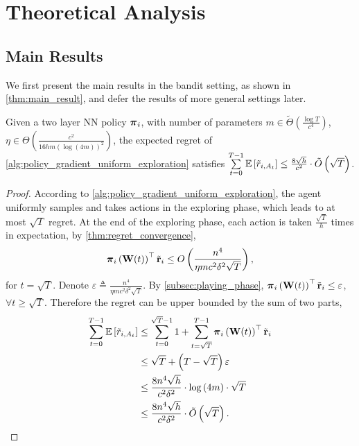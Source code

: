 \section{Theoretical Analysis}

\subsection{Main Results}
\label{subsec:main_results}

We first present the main results in the bandit setting, as shown in \cref{thm:main_result}, and defer the results of more general settings later.

\begin{thm}
\label{thm:main_result}
    Given a two layer NN policy ${\boldsymbol{\pi}}_i$, with number of parameters $m \in \tilde{\Theta}\left( \frac{\log{T}}{c^4} \right)$, $\eta \in \Theta\left( \frac{c^2}{16 h m \left( \log{\left(4m\right)} \right)^2} \right)$, the expected regret of \cref{alg:policy_gradient_uniform_exploration} satisfies $\sum\limits_{t=0}^{T-1}{ {\mathbb{E}} \left[ \tilde{r}_{i, A_t} \right] } \le  \frac{8\sqrt{h}}{c^2} \cdot \tilde{O}\left( \sqrt{T} \right)$.
\end{thm}
\begin{proof}
According to \cref{alg:policy_gradient_uniform_exploration}, the agent uniformly samples and takes actions in the exploring phase, which leads to at most $\sqrt{T}$ regret. At the end of the exploring phase, each action is taken $\frac{\sqrt{T}}{h}$ times in expectation, by \cref{thm:regret_convergence}, 
\begin{equation*}
\begin{split}
    {\boldsymbol{\pi}}_i\left( {\mathbf{W}}(t) \right)^\top {\tilde{\mathbf{r}}}_i \le O\left( \frac{n^4}{\eta m c^2 \delta^2 \sqrt{T}} \right),
\end{split}
\end{equation*}
for $t = \sqrt{T}$. Denote $\varepsilon \triangleq \frac{n^4}{\eta m c^2 \delta^2 \sqrt{T}}$. By \cref{subsec:playing_phase}, ${\boldsymbol{\pi}}_i\left( {\mathbf{W}}(t) \right)^\top {\tilde{\mathbf{r}}}_i \le \varepsilon$, $\forall t \ge \sqrt{T}$. Therefore the regret can be upper bounded by the sum of two parts,
\begin{equation*}
\begin{split}
    \sum\limits_{t=0}^{T-1}{ {\mathbb{E}} \left[ \tilde{r}_{i, A_t} \right] } &\le \sum\limits_{t=0}^{\sqrt{T}-1}{ 1 } + \sum\limits_{t=\sqrt{T}}^{T-1}{ {\boldsymbol{\pi}}_i\left( {\mathbf{W}}(t) \right)^\top {\tilde{\mathbf{r}}}_i } \\
    &\le \sqrt{T} + \left( T - \sqrt{T} \right) \varepsilon \\
    &\le \frac{8 n^4 \sqrt{h}}{c^2 \delta^2} \cdot \log{\left(4m\right)} \cdot \sqrt{T} \\
    &\le \frac{8 n^4 \sqrt{h}}{c^2 \delta^2} \cdot \tilde{O}\left(\sqrt{T}\right). \qedhere
\end{split}
\end{equation*}
\end{proof}

